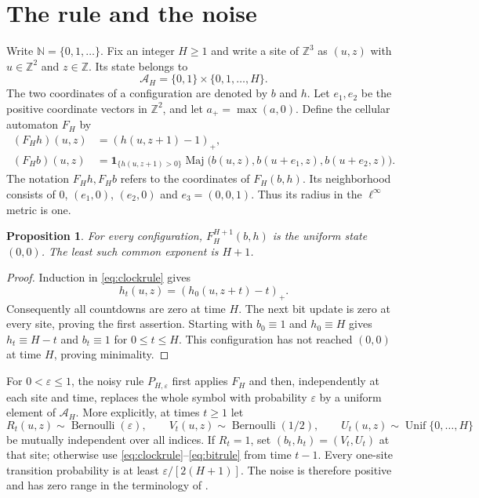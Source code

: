 \documentclass[11pt]{article}
\theoremstyle{plain}
\newtheorem{proposition}[theorem]{Proposition}
\theoremstyle{definition}
\theoremstyle{remark}
\newcommand{\Z}{\mathbb Z}
\newcommand{\N}{\mathbb N}
\newcommand{\eps}{\varepsilon}
\newcommand{\A}{\mathcal A}
\newcommand{\Maj}{\operatorname{Maj}}
\newcommand{\ind}{\mathbf 1}
\begin{document}
\section{The rule and the noise}\label{sec:rule}

Write $\N=\{0,1,\ldots\}$. Fix an integer $H\geq1$ and write a site of $\Z^3$ as $(u,z)$ with $u\in\Z^2$ and $z\in\Z$. Its state belongs to
\[
\A_H=\{0,1\}\times\{0,1,\ldots,H\}.
\]
The two coordinates of a configuration are denoted by $b$ and $h$. Let $e_1,e_2$ be the positive coordinate vectors in $\Z^2$, and let $a_+=\max(a,0)$. Define the cellular automaton $F_H$ by
\begin{align}
(F_Hh)(u,z)&=(h(u,z+1)-1)_+,\label{eq:clockrule}\\
(F_Hb)(u,z)&=\ind_{\{h(u,z+1)>0\}}
 \Maj\bigl(b(u,z),b(u+e_1,z),b(u+e_2,z)\bigr).
\label{eq:bitrule}
\end{align}
The notation $F_Hh,F_Hb$ refers to the coordinates of $F_H(b,h)$. Its neighborhood consists of $0$, $(e_1,0)$, $(e_2,0)$ and $e_3=(0,0,1)$. Thus its radius in the $\ell^\infty$ metric is one.

\begin{proposition}\label{prop:nilpotent}
For every configuration, $F_H^{H+1}(b,h)$ is the uniform state $(0,0)$. The least such common exponent is $H+1$.
\end{proposition}
\begin{proof}
Induction in \eqref{eq:clockrule} gives
\[
 h_t(u,z)=(h_0(u,z+t)-t)_+.
\]
Consequently all countdowns are zero at time $H$. The next bit update is zero at every site, proving the first assertion. Starting with $b_0\equiv1$ and $h_0\equiv H$ gives $h_t\equiv H-t$ and $b_t\equiv1$ for $0\leq t\leq H$. This configuration has not reached $(0,0)$ at time $H$, proving minimality.
\end{proof}

For $0<\eps\leq1$, the noisy rule $P_{H,\eps}$ first applies $F_H$ and then, independently at each site and time, replaces the whole symbol with probability $\eps$ by a uniform element of $\A_H$. More explicitly, at times $t\geq1$ let
\[
 R_t(u,z)\sim\operatorname{Bernoulli}(\eps),\qquad
 V_t(u,z)\sim\operatorname{Bernoulli}(1/2),\qquad
 U_t(u,z)\sim\operatorname{Unif}\{0,\ldots,H\}
\]
be mutually independent over all indices. If $R_t=1$, set $(b_t,h_t)=(V_t,U_t)$ at that site; otherwise use \eqref{eq:clockrule}--\eqref{eq:bitrule} from time $t-1$. Every one-site transition probability is at least $\eps/[2(H+1)]$. The noise is therefore positive and has zero range in the terminology of \cite{MST19}.
\end{document}
